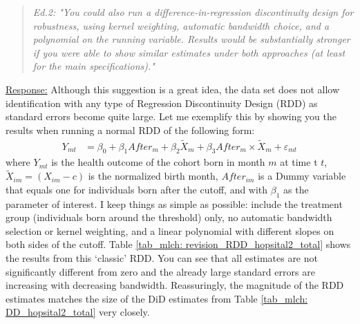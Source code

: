 {}
\bigskip
\begin{quote}
	\textit{Ed.2: "You could also run a difference-in-regression discontinuity design for robustness, using kernel weighting, automatic bandwidth choice, and a polynomial on the running variable. Results would be substantially stronger if you were able to show similar estimates under both approaches (at least for the main specifications)."}
\end{quote}
\underline{Response:}
Although this suggestion is a great idea, the data set does not allow identification with any type of Regression Discontinuity Design (RDD) as standard errors become quite large. Let me exemplify this by showing you the results when running a normal RDD of the following form: 
\begin{align}
Y_{mt} &= \beta_0 + \beta_1 After_{m} + \beta_2 \tilde X_{m} + \beta_3 After_{m} \times \tilde X_{m} + \varepsilon_{mt} \label{eq:RD}
\end{align}
where $Y_{mt}$ is the health outcome of the cohort born in month $m$ at time t $t$, $\tilde X_{im}=(X_{im}-c)$ is the normalized birth month, $After_{im}$ is a Dummy variable that equals one for individuals born after the cutoff, and with $\beta_1$ as the parameter of interest. I keep things as simple as possible: include the treatment group (individuals born around the threshold) only, no automatic bandwidth selection or kernel weighting, and a linear polynomial with different slopes on both sides of the cutoff. Table \ref{tab_mlch: revision_RDD_hopsital2_total} shows the results from this `classic' RDD. You can see that all estimates are not significantly different from zero and the already large standard errors are increasing with decreasing bandwidth. Reassuringly, the magnitude of the RDD estimates matches the size of the DiD estimates from Table \ref{tab_mlch: DD_hopsital2_total} very closely.

